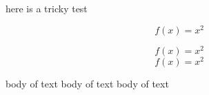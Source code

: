here is a tricky test \begin{myenv}\begin{equation*}f(x)=x^2\end{equation*}\end{myenv} \begin{equation*}f(x)=x^2\end{equation*} \begin{equation*}f(x)=x^2\end{equation*} 

\begin{myen}
	body of text
	body of text
	body of text
\end{myen}
